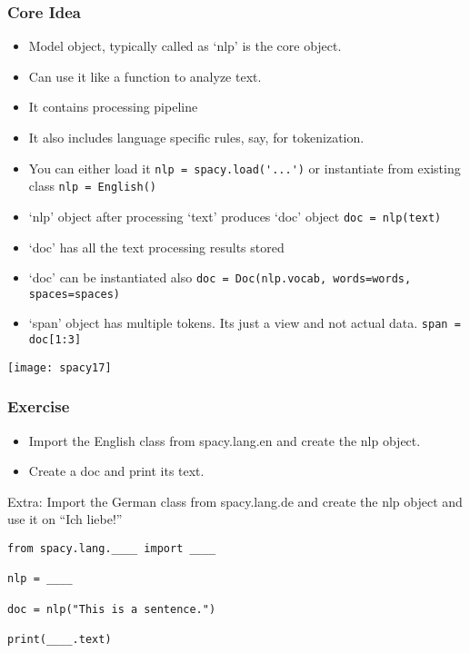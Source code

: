 \begin{frame}[fragile]\frametitle{Core Idea}
  \begin{itemize}
    \item Model object, typically called as `nlp' is the core object.
			\item Can use it like a function to analyze text.
		\item It contains processing pipeline
		\item It also includes language specific rules, say, for tokenization.
		\item You can either load it \lstinline|nlp = spacy.load('...')| or instantiate from existing class \lstinline|nlp = English()|
		\item `nlp' object after processing `text' produces `doc' object \lstinline|doc = nlp(text)|
		\item `doc' has all the text processing results stored
		\item `doc' can be instantiated also \lstinline|doc = Doc(nlp.vocab, words=words, spaces=spaces)|
		\item `span' object has multiple tokens. Its just a view and not actual data. \lstinline|span = doc[1:3]|
  \end{itemize}
	
\begin{center}
\texttt{[image: spacy17]}
\end{center}

\end{frame}

\begin{frame}[fragile]\frametitle{Exercise}

  \begin{itemize}
    \item Import the English class from spacy.lang.en and create the nlp object.
    \item Create a doc and print its text.
  \end{itemize}
  
  Extra: Import the German class from spacy.lang.de and create the nlp object and use it on ``Ich liebe!''


  \begin{lstlisting}
from spacy.lang.____ import ____

nlp = ____

doc = nlp("This is a sentence.")

print(____.text)
  \end{lstlisting}


\end{frame}

